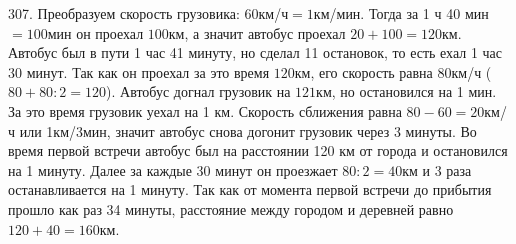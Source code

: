 307. Преобразуем скорость грузовика: 60км/ч$=1$км/мин. Тогда за 1 ч 40 мин$=100$мин он проехал $100$км, а значит автобус проехал $20+100=120$км. Автобус был в пути 1 час 41 минуту, но сделал 11 остановок, то есть ехал 1 час 30 минут. Так как он проехал за это время $120$км, его скорость равна $80$км/ч ($80+80:2=120$). Автобус догнал грузовик на $121$км, но остановился на 1 мин. За это время грузовик уехал на 1 км. Скорость сближения равна $80-60=20$км/ч или 1км/3мин, значит автобус снова догонит грузовик через 3 минуты. Во время первой встречи автобус был на расстоянии 120 км от города и остановился на 1 минуту. Далее за каждые 30 минут он проезжает $80:2=40$км и 3 раза останавливается на 1 минуту. Так как от момента первой встречи до прибытия прошло как раз 34 минуты, расстояние между городом и деревней равно
$120+40=160$км.\\
